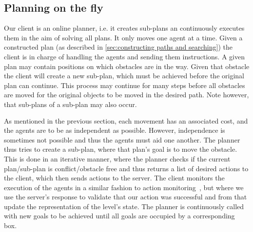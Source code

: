 \subsection{Planning on the fly}
\label{sec:planning on the fly}

Our client is an online planner, i.e. it creates sub-plans an continuously executes them in the aim of solving all plans.
It only moves one agent at a time.
Given a constructed plan (as described in \cref{sec:constructing paths and searching}) the client is in charge of handling the agents and sending them instructions.
A given plan may contain positions on which obstacles are in the way.
Given that obstacle the client will create a new sub-plan, which must be achieved before the original plan can continue.
This process may continue for many steps before all obstacles are moved for the original objects to be moved in the desired path.
Note however, that sub-plans of a sub-plan may also occur.

As mentioned in the previous section, each movement has an associated cost, and the agents are to be as independent as possible.
However, independence is sometimes not possible and thus the agents must aid one another.
The planner thus tries to create a sub-plan, where that plan's goal is to move the obstacle.
This is done in an iterative manner, where the planner checks if the current plan/sub-plan is conflict/obstacle free and thus returns a list of desired actions to the client, which then sends actions to the server.
The client monitors the execution of the agents in a similar fashion to action monitoring~\cite{russell2009modern}, but where we use the server's response to validate that our action was successful and from that update the representation of the level's state.
The planner is continuously called with new goals to be achieved until all goals are occupied by a corresponding box.
